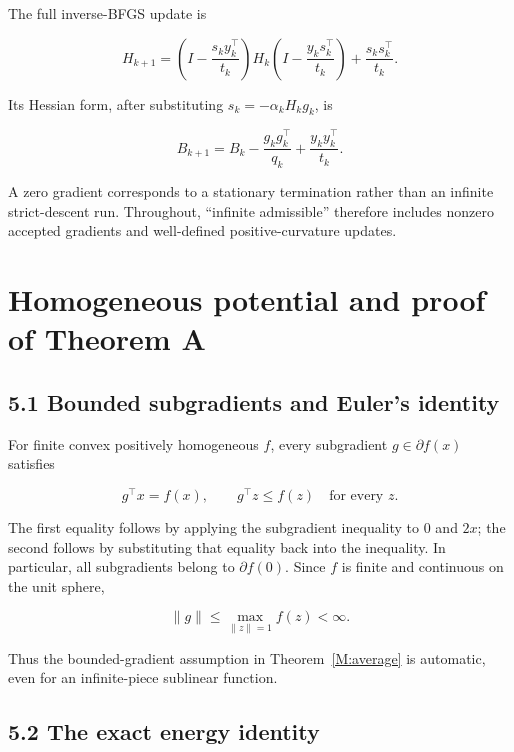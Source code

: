 The full inverse-BFGS update is

\[
H_{k+1}=
\left(I-\frac{s_ky_k^\top}{t_k}\right)
H_k
\left(I-\frac{y_ks_k^\top}{t_k}\right)
+\frac{s_ks_k^\top}{t_k}.
\]

Its Hessian form, after substituting \(s_k=-\alpha_kH_kg_k\), is

\[
\boxed{B_{k+1}=B_k-\frac{g_kg_k^\top}{q_k}
+\frac{y_ky_k^\top}{t_k}.}
\tag{H.2.1}
\]

A zero gradient corresponds to a stationary termination rather than an
infinite strict-descent run. Throughout, ``infinite admissible''
therefore includes nonzero accepted gradients and well-defined
positive-curvature updates.



\setcounter{section}{4}
\setcounter{theorem}{0}
\setcounter{lemma}{0}
\setcounter{corollary}{0}
\setcounter{proposition}{0}
\setcounter{remark}{0}
\setcounter{equation}{0}
\section{Homogeneous potential and proof of Theorem
A}\label{H:homogeneous-potential-and-proof-of-theorem-a}

\subsection{5.1 Bounded subgradients and Euler's
identity}\label{H:bounded-subgradients-and-eulers-identity}

For finite convex positively homogeneous \(f\), every subgradient
\(g\in\partial f(x)\) satisfies

\[
g^\top x=f(x),\qquad g^\top z\le f(z)\quad\text{for every }z.
\]

The first equality follows by applying the subgradient inequality to
\(0\) and \(2x\); the second follows by substituting that equality back
into the inequality. In particular, all subgradients belong to
\(\partial f(0)\). Since \(f\) is finite and continuous on the unit
sphere,

\[
\|g\|\le\max_{\|z\|=1}f(z)<\infty.
\]

Thus the bounded-gradient assumption in Theorem~\ref{M:average} is automatic, even for
an infinite-piece sublinear function.

\subsection{5.2 The exact energy
identity}\label{H:the-exact-energy-identity}

